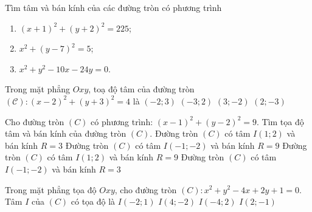 \begin{bt}%
	Tìm tâm và bán kính của các đường tròn có phương trình
	\begin{enumerate}
		\item $(x+1)^2+(y+2)^2=225$;
		\item $x^2+(y-7)^2=5$;
		\item $x^2+y^2-10x-24y=0$.
	\end{enumerate}
\end{bt}


\begin{ex}%
	Trong mặt phẳng $O x y$, toạ độ tâm của đường tròn  $(\mathscr{C})\colon(x-2)^2+(y+3)^2=4$ là
	 \choice
		{$(-2;  3)$}
		{$(-3; 2)$} 
		 {$(3;-2)$}
		{\True$(2;-3)$} 
\end{ex}

\begin{ex}%
	Cho đường tròn $(C)$ có phương trình: $\left(x-1\right)^2+\left(y-2\right)^2=9$. Tìm tọa độ tâm và bán kính của đường  tròn $(C)$.
	\choice 
		{\True  Đường tròn $(C)$ có tâm $ I\left(1;2\right)$ và bán kính $ R=3$}
		{Đường  tròn $(C)$ có tâm $ I\left(-1;-2\right)$ và bán kính $ R=9$}
		{Đường tròn $(C)$ có tâm $ I\left(1;2\right)$  và bán kính $ R=9$}
		{Đường tròn $(C)$ có tâm $ I\left(-1;-2\right)$ và bán kính $  R=3$}
\end{ex}

\begin{ex}%
	Trong mặt phẳng tọa độ $Oxy$, cho đường tròn $(C)\colon  x^2+y^2-4x+2y+1=0$. Tâm $I$ của $(C)$ có tọa độ là
	 \choice
		 {$I(-2; 1)$}
		{$I(4;-2)$} 
		{$I(-4; 2)$} 
		{\True  $I(2;-1)$}
\end{ex}

